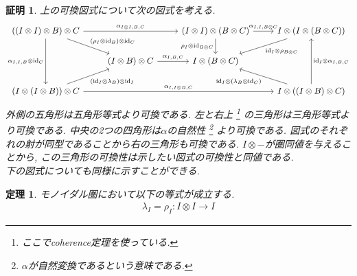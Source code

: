 \documentclass[a4paper,12pt]{ltjsarticle}
\theoremstyle{break}
\newtheorem{thrm}[thm]{定理}
\newtheorem*{prf}{証明}
\newcommand{\id}{\mathrm{id}}
\newcommand{\al}{\alpha}
\newcommand{\la}{\lambda}
\newcommand{\ot}{\otimes}
\numberwithin{equation}{section}
\begin{document}
\begin{prf}
  上の可換図式について次の図式を考える. 
  \[\begin{tikzcd}
    {((I \ot I) \ot B) \ot C} && {(I \ot I) \ot (B \ot C)} & {I \ot (I \ot (B \ot C))} \\
    & {(I \ot B) \ot C} & {I \ot (B \ot C)} \\
    {(I \ot (I \ot B)) \ot C} &&& {I \ot ((I \ot B) \ot C) }
    \arrow["{(\rho_I \ot \id_B) \ot \id_C}", from=1-1, to=2-2]
    \arrow["{\al_{I,I,B} \ot \id_C}"', from=1-1, to=3-1]
    \arrow["{(\id_I \ot \la_B) \ot \id_I}"', from=3-1, to=2-2]
    \arrow["{\al_{I,B,C}}", from=2-2, to=2-3]
    \arrow["{\al_{I \ot I,B,C}}", from=1-1, to=1-3]
    \arrow["{\rho_I \ot \id_{B \ot C}}"', from=1-3, to=2-3]
    \arrow["{\al_{I,I,B \ot C}}", from=1-3, to=1-4]
    \arrow["{\al_{I,I \ot B,C}}", from=3-1, to=3-4]
    \arrow["{\id_I \ot (\la_B \ot \id_C)}", from=3-4, to=2-3]
    \arrow["{\id_I \ot \al_{I,B,C}}"', from=3-4, to=1-4]
    \arrow["{\id_I \ot \rho_{B \ot C}}", from=1-4, to=2-3]
  \end{tikzcd}\]
  外側の五角形は五角形等式より可換である. 
  左と右上
  \footnote{
    ここでcoherence定理を使っている. 
  }
  の三角形は三角形等式より可換である. %
  中央の2つの四角形は$\al$の自然性
  \footnote{
    $\al$が自然変換であるという意味である. 
  }
  より可換である.
  図式のそれぞれの射が同型であることから右の三角形も可換である. 
  $I \ot -$が圏同値を与えることから, この三角形の可換性は示したい図式の可換性と同値である. \\
  下の図式についても同様に示すことができる. 
\end{prf}

\begin{thrm}
  モノイダル圏において以下の等式が成立する. 
  \begin{align*}
    \la_I =\rho_I :I \ot I \to I
  \end{align*}
\end{thrm}
\end{document}
